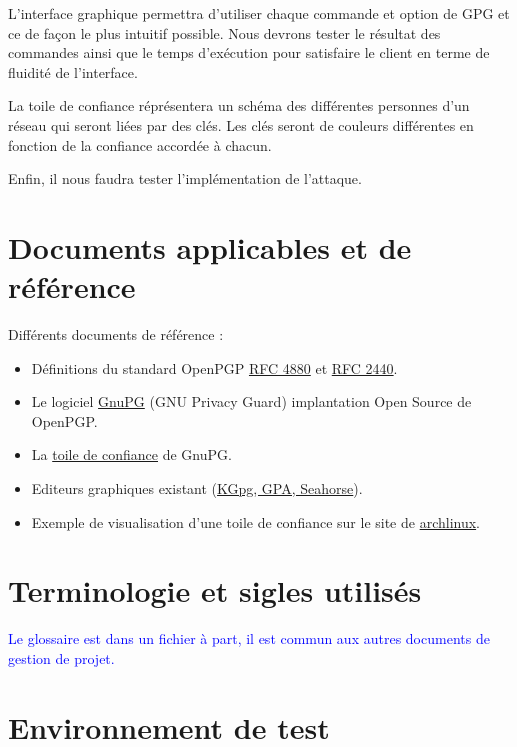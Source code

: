 \documentclass{../res/univ-projet}
\begin{document}
L'interface graphique permettra d'utiliser chaque commande et option de GPG et ce de façon le plus intuitif possible. Nous
devrons tester le résultat des commandes ainsi que le temps d'exécution pour satisfaire le client en terme de fluidité de l'interface.

La toile de confiance réprésentera un schéma des différentes personnes d'un réseau qui seront liées par des clés.
Les clés seront de couleurs différentes en fonction de la confiance accordée à chacun.

Enfin, il nous faudra tester l'implémentation de l'attaque. 


\section{Documents applicables et de référence}
Différents documents de référence :
\begin{itemize}
\item Définitions du standard OpenPGP \href{file:../../ressources/openPGP/rfc4880-en.pdf}{RFC 4880}
  et \href{file:../../ressources/openPGP/rfc2440-fr.pdf}{RFC 2440}.
\item Le logiciel \href{https://www.gnupg.org/}{GnuPG} (GNU Privacy Guard) implantation Open Source
  de OpenPGP.
\item La \href{https://www.gnupg.org/gph/fr/manual.html#AEN541}{toile de confiance} de GnuPG.
\item Editeurs graphiques existant
  (\href{http://www.gnupg.org/related_software/frontends.en.html}{KGpg, GPA, Seahorse}).
\item Exemple de visualisation d'une toile de confiance sur le site de 
  \href{https://www.archlinux.org/master-keys/#visualization}{archlinux}.
\end{itemize}

\section{Terminologie et sigles utilisés}
\textcolor{blue}{
  Le glossaire est dans un fichier à part, il est commun aux autres documents de gestion de projet.
}

\section{Environnement de test}
\end{document}
